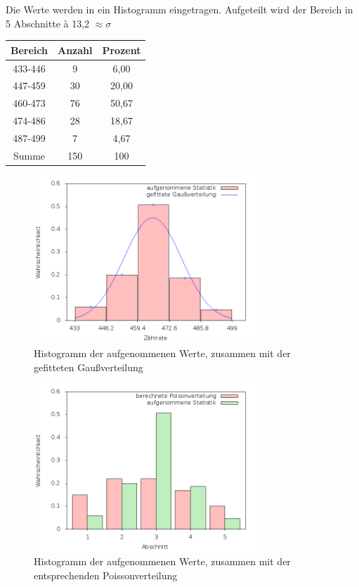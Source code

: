 Die Werte werden in ein Histogramm eingetragen. Aufgeteilt wird der Bereich in 5 Abschnitte à 13,2 $\approx \sigma$
\begin{table}[H]
\begin{tabular}{c|c|c|}
Bereich	&Anzahl&	Prozent\\ \hline 
433-446	&9	&6,00\\ \hline
447-459	&30	&20,00\\ \hline
460-473	&76	&50,67\\ \hline
474-486	&28	&18,67\\ \hline
487-499	&7	&4,67\\ \hline\hline
Summe	&150	&100  
\end{tabular} 
\end{table}

\begin{figure}[H]
\includegraphics[width=0.75\textwidth]{pics/Gauss.png}
\caption{Histogramm der aufgenommenen Werte, zusammen mit der gefitteten Gaußverteilung}
\end{figure}

\begin{figure}[H]
\includegraphics[width=0.75\textwidth]{pics/poisson.png}
\caption{Histogramm der aufgenommenen Werte, zusammen mit der entsprechenden Poissonverteilung}
\end{figure}

